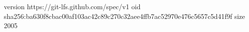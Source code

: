 version https://git-lfs.github.com/spec/v1
oid sha256:ba630f8cbac00af103ac42c89c270c32aee4ffb7ac52970e476c5657c5d41f9f
size 2005
